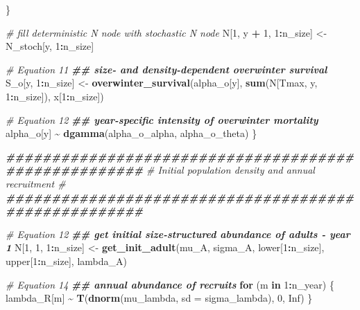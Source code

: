 \documentclass[
]{article}
\newenvironment{Shaded}{\begin{snugshade}}{\end{snugshade}}
\newcommand{\AttributeTok}[1]{\textcolor[rgb]{0.13,0.29,0.53}{#1}}
\newcommand{\CommentTok}[1]{\textcolor[rgb]{0.56,0.35,0.01}{\textit{#1}}}
\newcommand{\ConstantTok}[1]{\textcolor[rgb]{0.56,0.35,0.01}{#1}}
\newcommand{\ControlFlowTok}[1]{\textcolor[rgb]{0.13,0.29,0.53}{\textbf{#1}}}
\newcommand{\DecValTok}[1]{\textcolor[rgb]{0.00,0.00,0.81}{#1}}
\newcommand{\DocumentationTok}[1]{\textcolor[rgb]{0.56,0.35,0.01}{\textbf{\textit{#1}}}}
\newcommand{\FunctionTok}[1]{\textcolor[rgb]{0.13,0.29,0.53}{\textbf{#1}}}
\newcommand{\NormalTok}[1]{#1}
\newcommand{\OtherTok}[1]{\textcolor[rgb]{0.56,0.35,0.01}{#1}}
\newcommand{\SpecialCharTok}[1]{\textcolor[rgb]{0.81,0.36,0.00}{\textbf{#1}}}
\begin{document}
\begin{Shaded}
\begin{Highlighting}[]
\NormalTok{    \}}
    
    \CommentTok{\# fill deterministic N node with stochastic N node}
\NormalTok{    N[}\DecValTok{1}\NormalTok{, y }\SpecialCharTok{+} \DecValTok{1}\NormalTok{, }\DecValTok{1}\SpecialCharTok{:}\NormalTok{n\_size] }\OtherTok{\textless{}{-}}\NormalTok{ N\_stoch[y, }\DecValTok{1}\SpecialCharTok{:}\NormalTok{n\_size]}
    
    \CommentTok{\# Equation 11}
    \DocumentationTok{\#\# size{-} and density{-}dependent overwinter survival}
\NormalTok{    S\_o[y, }\DecValTok{1}\SpecialCharTok{:}\NormalTok{n\_size] }\OtherTok{\textless{}{-}} \FunctionTok{overwinter\_survival}\NormalTok{(alpha\_o[y], }
                                            \FunctionTok{sum}\NormalTok{(N[Tmax, y, }\DecValTok{1}\SpecialCharTok{:}\NormalTok{n\_size]), }
\NormalTok{                                            x[}\DecValTok{1}\SpecialCharTok{:}\NormalTok{n\_size])}
    
    \CommentTok{\# Equation 12}
    \DocumentationTok{\#\# year{-}specific intensity of overwinter mortality}
\NormalTok{    alpha\_o[y] }\SpecialCharTok{\textasciitilde{}} \FunctionTok{dgamma}\NormalTok{(alpha\_o\_alpha, alpha\_o\_theta)}
\NormalTok{  \}}
  
  \DocumentationTok{\#\#\#\#\#\#\#\#\#\#\#\#\#\#\#\#\#\#\#\#\#\#\#\#\#\#\#\#\#\#\#\#\#\#\#\#\#\#\#\#\#\#\#\#\#\#\#\#\#\#\#\#\#}
  \CommentTok{\# Initial population density and annual recruitment \#}
  \DocumentationTok{\#\#\#\#\#\#\#\#\#\#\#\#\#\#\#\#\#\#\#\#\#\#\#\#\#\#\#\#\#\#\#\#\#\#\#\#\#\#\#\#\#\#\#\#\#\#\#\#\#\#\#\#\#}
  
  \CommentTok{\# Equation 12}
  \DocumentationTok{\#\# get initial size{-}structured abundance of adults {-} year 1}
\NormalTok{  N[}\DecValTok{1}\NormalTok{, }\DecValTok{1}\NormalTok{, }\DecValTok{1}\SpecialCharTok{:}\NormalTok{n\_size] }\OtherTok{\textless{}{-}} \FunctionTok{get\_init\_adult}\NormalTok{(mu\_A, sigma\_A, lower[}\DecValTok{1}\SpecialCharTok{:}\NormalTok{n\_size], }
\NormalTok{                                      upper[}\DecValTok{1}\SpecialCharTok{:}\NormalTok{n\_size], lambda\_A)}
  
  \CommentTok{\# Equation 14}
  \DocumentationTok{\#\# annual abundance of recruits}
  \ControlFlowTok{for}\NormalTok{ (m }\ControlFlowTok{in} \DecValTok{1}\SpecialCharTok{:}\NormalTok{n\_year) \{}
\NormalTok{   lambda\_R[m] }\SpecialCharTok{\textasciitilde{}} \FunctionTok{T}\NormalTok{(}\FunctionTok{dnorm}\NormalTok{(mu\_lambda, }\AttributeTok{sd =}\NormalTok{ sigma\_lambda), }\DecValTok{0}\NormalTok{, }\ConstantTok{Inf}\NormalTok{)}
\NormalTok{  \}}
  

\end{Highlighting}
\end{Shaded}
\end{document}
